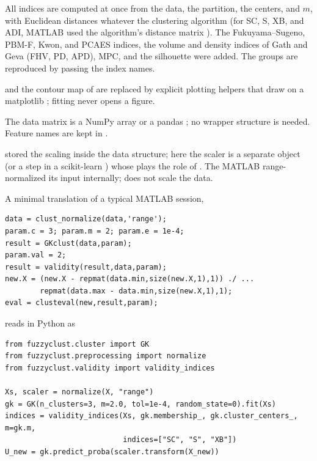 \begin{description}[style=nextline]
\item[Validity.] All indices are computed at once from the data, the partition, the centers, and $m$, with Euclidean distances whatever the clustering algorithm (for SC, S, XB, and ADI, MATLAB used the algorithm's distance matrix ). The Fukuyama--Sugeno, PBM-F, Kwon, and PCAES indices, the volume and density indices of Gath and Geva (FHV, PD, APD), MPC, and the silhouette were added. The  groups are reproduced by passing the index names.
\item[Plotting.]  and the contour map of  are replaced by explicit plotting helpers that draw on a matplotlib ; fitting never opens a figure.
\item[Data.] The data matrix is a NumPy array or a pandas ; no wrapper structure is needed. Feature names are kept in .
\item[Normalization.]  stored the scaling inside the data structure; here the scaler is a separate object (or a step in a scikit-learn ) whose  plays the role of . The MATLAB  range-normalized its input internally;  does not scale the data.
\end{description}

A minimal translation of a typical MATLAB session,
\begin{verbatim}
data = clust_normalize(data,'range');
param.c = 3; param.m = 2; param.e = 1e-4;
result = GKclust(data,param);
param.val = 2;
result = validity(result,data,param);
new.X = (new.X - repmat(data.min,size(new.X,1),1)) ./ ...
        repmat(data.max - data.min,size(new.X,1),1);
eval = clusteval(new,result,param);
\end{verbatim}
reads in Python as
\begin{lstlisting}
from fuzzyclust.cluster import GK
from fuzzyclust.preprocessing import normalize
from fuzzyclust.validity import validity_indices

Xs, scaler = normalize(X, "range")
gk = GK(n_clusters=3, m=2.0, tol=1e-4, random_state=0).fit(Xs)
indices = validity_indices(Xs, gk.membership_, gk.cluster_centers_, m=gk.m,
                           indices=["SC", "S", "XB"])
U_new = gk.predict_proba(scaler.transform(X_new))
\end{lstlisting}
